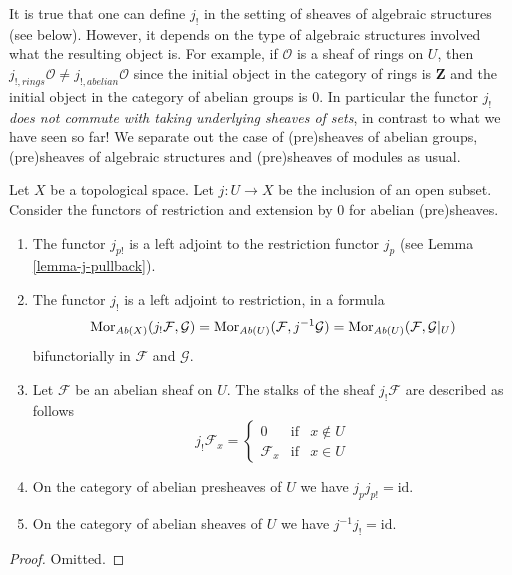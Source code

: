 \noindent
It is true that one can define $j_!$ in the setting of sheaves
of algebraic structures (see below). However, it depends on the
type of algebraic structures involved what the resulting
object is. For example, if $\mathcal{O}$ is a sheaf of rings
on $U$, then $j_{!, rings}\mathcal{O} \not = j_{!, abelian}\mathcal{O}$
since the initial object in the category of rings
is $\mathbf{Z}$ and the initial object in the category
of abelian groups is $0$. In particular the functor $j_!$
{\it does not commute with taking underlying sheaves of sets},
in contrast to what we have seen so far! We separate out the case
of (pre)sheaves of abelian groups, (pre)sheaves of algebraic structures
and (pre)sheaves of modules as usual.

\begin{lemma}
\label{lemma-j-shriek-abelian}
Let $X$ be a topological space.
Let $j : U \to X$ be the inclusion of an open subset.
Consider the functors of restriction and extension
by $0$ for abelian (pre)sheaves.
\begin{enumerate}
\item The functor $j_{p!}$ is a left adjoint to the
restriction functor $j_p$ (see Lemma \ref{lemma-j-pullback}).
\item The functor $j_!$ is a left adjoint to restriction,
in a formula
$$
\mathop{\mathrm{Mor}}\nolimits_{\textit{Ab}(X)}(j_!\mathcal{F}, \mathcal{G})
=
\mathop{\mathrm{Mor}}\nolimits_{\textit{Ab}(U)}(\mathcal{F}, j^{-1}\mathcal{G})
=
\mathop{\mathrm{Mor}}\nolimits_{\textit{Ab}(U)}(\mathcal{F}, \mathcal{G}|_U)
$$
bifunctorially in $\mathcal{F}$ and $\mathcal{G}$.
\item Let $\mathcal{F}$ be an abelian sheaf on $U$.
The stalks of the sheaf $j_!\mathcal{F}$ are described
as follows
$$
j_{!}\mathcal{F}_x =
\left\{
\begin{matrix}
0 & \text{if} & x \not \in U \\
\mathcal{F}_x & \text{if} & x \in U
\end{matrix}
\right.
$$
\item On the category of abelian presheaves of $U$
we have $j_pj_{p!} = \text{id}$.
\item On the category of abelian sheaves of $U$
we have $j^{-1}j_! = \text{id}$.
\end{enumerate}
\end{lemma}

\begin{proof}
Omitted.
\end{proof}

